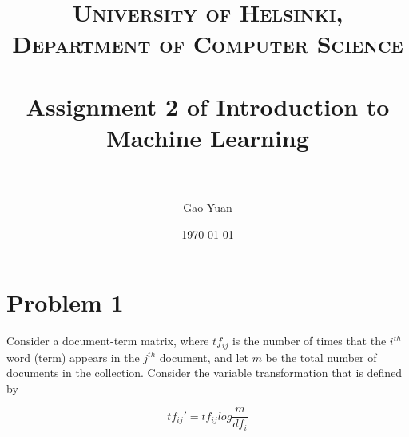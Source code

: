 \documentclass[paper=a4, fontsize=11pt]{scrartcl} %
\title{	
\normalfont \normalsize 
\textsc{University of Helsinki, Department of Computer Science} \\ [25pt] %
\horrule{0.5pt} \\[0.4cm] %
\huge Assignment 2 of Introduction to Machine Learning \\ %
\horrule{2pt} \\[0.5cm] %
}
\author{Gao Yuan} %
\date{\normalsize\today} %
\numberwithin{equation}{section} %
\numberwithin{figure}{section} %
\numberwithin{table}{section} %
\begin{document}
\maketitle %


\section{Problem 1}

Consider a document-term matrix, where $tf_{ij}$ is the number of times that the $i^{th}$ word (term) appears in the $j^{th}$ document, and let $m$ be the total number of documents in the collection. Consider the variable transformation that is defined by 

$$ tf_{ij}' = tf_{ij}log\frac{m}{df_i}$$
\end{document}
